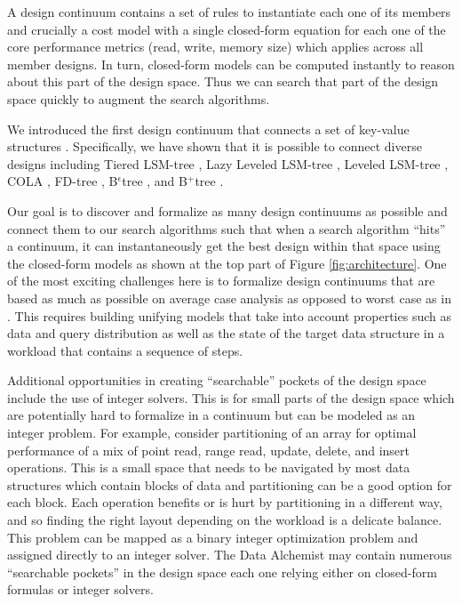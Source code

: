 \documentclass[11pt]{article}
\begin{document}
A design continuum contains a set of rules to instantiate each one of its members and crucially a cost model with a single closed-form equation for each one of the core performance metrics (read, write, memory size) which applies across all member designs. In turn, closed-form models can be computed instantly to reason about this part of the design space. Thus we can search that part of the design space quickly to augment the search algorithms. 

We introduced the first design continuum that connects a set of key-value structures \cite{Idreos2019}. Specifically, we have shown that it is possible to connect diverse designs including Tiered LSM-tree \cite{Jagadish1997, Dayan2017, Dayan2018a, Dayan2019, Lakshman2010}, Lazy Leveled LSM-tree \cite{Dayan2018}, Leveled LSM-tree \cite{ONeil1996, Dayan2017, FacebookRocksDB, GoogleLevelDB}, COLA \cite{Bender2007, Jermaine2007}, FD-tree \cite{Li2010}, B$^{\epsilon}$tree \cite{Brodal2003, Arge2003, Bender2007, Jannen2015, Jermaine2007, Papagiannis2016}, and B$^{+}$tree \cite{Bayer1970}. 

Our goal is to discover and formalize as many design continuums as possible and connect them to our search algorithms such that when a search algorithm ``hits'' a continuum, it can instantaneously get the best design within that space using the closed-form models as shown at the top part of Figure \ref{fig:architecture}. One of the most exciting challenges here is to formalize design continuums that are based as much as possible on average case analysis as opposed to worst case as in \cite{Idreos2019}. This requires building unifying models that take into account properties such as data and query distribution as well as the state of the target data structure in a workload that contains a sequence of steps. 

Additional opportunities in creating ``searchable'' pockets of the design space include the use of integer solvers. This is for small parts of the design space which are potentially hard to formalize in a continuum but can be modeled as an integer problem. For example, consider partitioning of an array for optimal performance of a mix of point read, range read, update, delete, and insert operations. This is a small space that needs to be navigated by most data structures which contain blocks of data and partitioning can be a good option for each block. Each operation benefits or is hurt by partitioning in a different way, and so finding the right layout depending on the workload is a delicate balance. This problem can be mapped as a binary integer optimization problem and assigned directly to an integer solver. The Data Alchemist may contain numerous ``searchable pockets'' in the design space each one relying either on closed-form formulas or integer solvers.   
\end{document}
